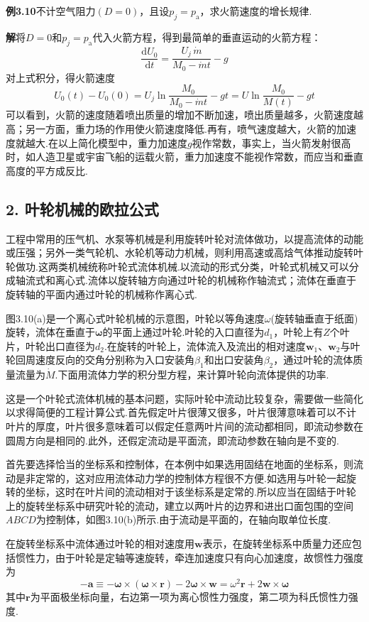 \noindent\textbf{例3.10}\quad 不计空气阻力$(D=0)$，且设$p_j=p_{\mathrm{a}}$，求火箭速度的增长规律.

\noindent\textbf{解}\quad 将$D=0$和$p_j=p_{\mathrm{a}}$代入火箭方程，得到最简单的垂直运动的火箭方程：
\[
\frac{\mathrm{d}U_0}{\mathrm{d}t}=\frac{U_j\,\dot{m}}{M_0-\dot{m}t}-g
\]
对上式积分，得火箭速度
\[
U_0(t)-U_0(0)=U_j\ln\frac{M_0}{M_0-\dot{m}t}-gt=U\ln\frac{M_0}{M(t)}-gt
\]
可以看到，火箭的速度随着喷出质量的增加不断加速，喷出质量越多，火箭速度越高；另一方面，重力场的作用使火箭速度降低.再有，喷气速度越大，火箭的加速度就越大.在以上简化模型中，重力加速度$g$视作常数，事实上，当火箭发射很高时，如人造卫星或宇宙飞船的运载火箭，重力加速度不能视作常数，而应当和垂直高度的平方成反比.

\subsection*{2. 叶轮机械的欧拉公式}

工程中常用的压气机、水泵等机械是利用旋转叶轮对流体做功，以提高流体的动能或压强；另外一类气轮机、水轮机等动力机械，则利用高速或高焓气体推动旋转叶轮做功.这两类机械统称叶轮式流体机械.以流动的形式分类，叶轮式机械又可以分成轴流式和离心式.流体以旋转轴方向通过叶轮的机械称作轴流式；流体在垂直于旋转轴的平面内通过叶轮的机械称作离心式.

图3.10(a)是一个离心式叶轮机械的示意图，叶轮以等角速度$\omega$(旋转轴垂直于纸面)旋转，流体在垂直于$\boldsymbol{\omega}$的平面上通过叶轮.叶轮的入口直径为$d_1$，叶轮上有$Z$个叶片，叶轮出口直径为$d_2$.在旋转的叶轮上，流体流入及流出的相对速度$\boldsymbol{w}_1$、$\boldsymbol{w}_2$与叶轮回周速度反向的交角分别称为入口安装角$\beta_1$和出口安装角$\beta_2$，通过叶轮的流体质量流量为$\dot{M}$.下面用流体力学的积分型方程，来计算叶轮向流体提供的功率.

这是一个叶轮式流体机械的基本问题，实际叶轮中流动比较复杂，需要做一些简化以求得简便的工程计算公式.首先假定叶片很薄又很多，叶片很薄意味着可以不计叶片的厚度，叶片很多意味着可以假定任意两叶片间的流动都相同，即流动参数在圆周方向是相同的.此外，还假定流动是平面流，即流动参数在轴向是不变的.

首先要选择恰当的坐标系和控制体，在本例中如果选用固结在地面的坐标系，则流动是非定常的，这对应用流体动力学的控制体方程很不方便.如选用与叶轮一起旋转的坐标，这时在叶片间的流动相对于该坐标系是定常的.所以应当在固结于叶轮上的旋转坐标系中研究叶轮的流动，建立以两叶片的边界和进出口面包围的空间$ABCD$为控制体，如图3.10(b)所示.由于流动是平面的，在轴向取单位长度.

在旋转坐标系中流体通过叶轮的相对速度用$\boldsymbol{w}$表示，在旋转坐标系中质量力还应包括惯性力，由于叶轮是定轴等速旋转，牵连加速度只有向心加速度，故惯性力强度为
\[
-\boldsymbol{a}\equiv-\boldsymbol{\omega}\times(\boldsymbol{\omega}\times\boldsymbol{r})-2\boldsymbol{\omega}\times\boldsymbol{w}=\omega^{2}\boldsymbol{r}+2\boldsymbol{w}\times\boldsymbol{\omega}
\]
其中$\boldsymbol{r}$为平面极坐标向量，右边第一项为离心惯性力强度，第二项为科氏惯性力强度.

